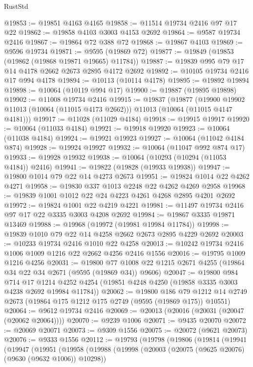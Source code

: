 \begin{lexlean}{RustStd}
\begin{coremodule}
@19853 := @19851 @4163 @4165
@19858 := @11514 @19734 @2416 @97 @17 @22
@19862 := @19858 @4103 @3003 @4153 @2692
@19864 := @9587 @19734 @2416
@19867 := @19864 @72 @388 @72
@19868 := @19867 @4103
@19869 := @9596 @19734
@19871 := @9595 (@19869 @72)
@19877 := @19849 (@19853 (@19862 (@19868 @19871 @19665) @11784))
@19887 := @19839 @995 @79 @17 @14 @4178 @2662 @2673 @2895 @4172 @2692
@19892 := @10105 @19734 @2416 @17 @994 @4178
@19894 := @10113 (@10114 @4178)
@19895 := @19892 @19894
@19898 := @10064 (@10119 @994 @17)
@19900 := @19887 (@19895 @19898)
@19902 := @11008 @19734 @2416
@19915 := @19837
    (@19877
      (@19900 @19902 @11013 (@10064 (@11015 @4173 @2662)))
      @11013
      (@10064 (@11015 @4147 @4181)))
@19917 := @11028 (@11029 @4184)
@19918 := @19915 @19917
@19920 := @10064 (@11033 @4184)
@19921 := @19918 @19920
@19923 := @10064 (@11038 @4184)
@19924 := @19921 @19923
@19927 := @10064 (@11042 @4184 @874)
@19928 := @19924 @19927
@19932 := @10064 (@11047 @992 @874 @17)
@19933 := @19928 @19932
@19938 := @10064 (@10293 (@10294 (@11053 @4184)) @2416)
@19941 := @19822 (@19828 (@19933 @19938))
@19947 := @19800 @1014 @79 @22 @14 @4273 @2673
@19951 := @19824 @1014 @22 @4262 @4271
@19958 := @19830 @337 @1013 @2248 @22 @4262 @4269 @2958
@19968 := @19839 @1001 @1012 @22 @24 @4223 @4261 @4268 @2895 @4201 @2692
@19972 := @19824 @1001 @22 @4219 @4221
@19981 := @11497 @19734 @2416 @97 @17 @22 @3335 @3003 @4208 @2692
@19984 := @19867 @3335 @19871 @13469
@19988 := @19968 (@19972 (@19981 @19984 @11784))
@19998 := @19839 @1010 @79 @22 @14 @4258 @2662 @2673 @2895 @4229 @2692
@20003 := @10233 @19734 @2416 @1010 @22 @4258
@20013 := @10242 @19734 @2416 @1006 @1009 @1216 @22 @2662 @4256 @2416 @1556
@20016 := @19795 @1009 @1216 @4256
@20031 := @19800
    @77
    @1008
    @22
    @1215
    @2671
    @4255
    (@19864 @34 @22 @34 @2671 (@9595 (@19869 @34)) @9606)
@20047 := @19800
    @984
    @714
    @17
    @1214
    @4252
    @4254
    (@19851 @4248 @4250 (@19858 @3335 @3003 @4238 @2692 @19984 @11784))
@20062 := @19800
    @186
    @79
    @1212
    @14
    @2749
    @2673
    (@19864 @175 @1212 @175 @2749 (@9595 (@19869 @175)) @10551)
@20064 := @9612 @19734 @2416
@20069 := @20013 (@20016 (@20031 (@20047 (@20062 @20064))))
@20070 := @9239 @1006
@20071 := @9435 @20070
@20072 := @20069 @20071
@20073 := @9309 @1556
@20075 := @20072 (@9621 @20073)
@20076 := @9333 @1556
@20112 := @19793
    (@19798
      (@19806
        (@19814
          (@19941
            (@19947
              (@19951
                (@19958
                  (@19988
                    (@19998
                      (@20003 (@20075 (@9625 @20076) (@9630 (@9632 @1006)) @10298))

\end{coremodule}
\end{lexlean}
